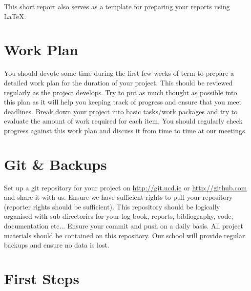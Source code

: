 \documentclass[]{monthly-report}
\begin{document}

\def\studentname{David Hayes}
\def\projecttitle{Learning Signal Feature Representation using Generative Adversarial Networks}
\def\ucdstudentnumber{\hl{student number}}
\def\monthlyreportnumber{\hl{0}}
\maketitle


This short report also serves as a template for preparing your reports using \LaTeX.  

\section{Work Plan}

You should devote some time during the first few weeks of term to prepare a detailed work plan for the duration of your project. This should be reviewed regularly as the project develops. Try to put as much thought as possible into this plan as it will help you keeping track of progress and ensure that you meet deadlines. Break down your project into basic tasks/work packages and try to evaluate the amount of work required for each item. You should regularly check progress against this work plan and discuss it from time to time at our meetings.

\section{Git \& Backups}

Set up a git repository for your project on \url{http://git.ucd.ie} or  \url{http://github.com} and share it with us. Ensure we have sufficient rights to pull your repository (reporter rights should be sufficient). This repository should be logically organised with sub-directories for your log-book, reports, bibliography, code, documentation etc... Ensure your commit and push on a daily basis. All project materials should be contained on this repository. Our school will provide regular backups and ensure no data is lost.

\section{First Steps}
\end{document}

